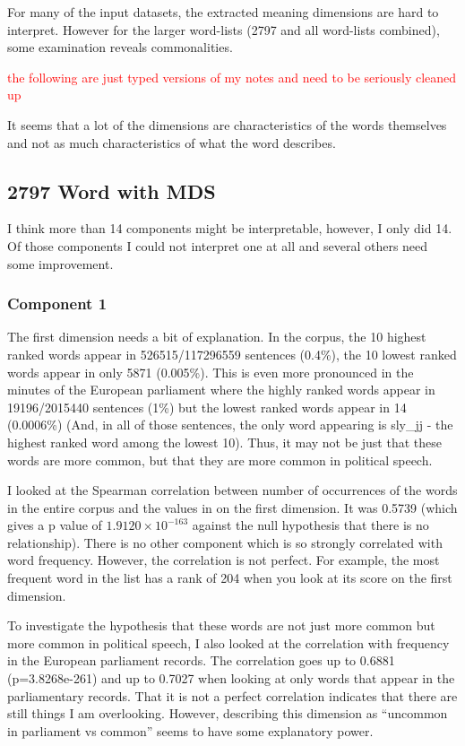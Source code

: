 \documentclass[10pt,letterpaper]{book}
\newcommand{\todo}[1]{\textcolor{red}{#1}}
\begin{document}
For many of the input datasets, the extracted meaning dimensions are hard to 
interpret. However for the larger word-lists (2797 and all word-lists 
combined), some examination reveals commonalities. 

\todo{the following are just typed versions of my notes and need to be 
seriously cleaned up}

It seems that a lot of the dimensions are characteristics of the words 
themselves and not as much characteristics of what the word describes.

\subsection{2797 Word with MDS}

I think more than 14 components might be interpretable, however, I only did 14. 
Of those components I could not interpret one at all and several others need 
some improvement. 

\subsubsection{Component 1}

The first dimension needs a bit of explanation. In the corpus, the 10 highest 
ranked words appear in 526515/117296559 sentences (0.4\%), the 10 lowest 
ranked words appear in only 5871 (0.005\%). This is even more pronounced in the 
minutes of the European parliament where the highly ranked words appear in 
19196/2015440 sentences (1\%) but the lowest ranked words appear in 14 
(0.0006\%) (And, in all of those sentences, the only word appearing is 
sly\_jj - the highest ranked word among the lowest 10). Thus, it may not be 
just that these words are more common, but that they are more common in 
political speech.

I looked at the Spearman correlation between number of occurrences of the words 
in the entire corpus and the values in on the first dimension. It was 0.5739 
(which gives a p value of $1.9120 \times 10^{-163}$ against the null hypothesis 
that there is no relationship). There is no other component which is so 
strongly correlated with word frequency. However, the correlation is not 
perfect. For example, the most frequent word in the list has a rank of 204 when 
you look at its score on the first dimension.

To investigate the hypothesis that these words are not just more common but 
more common in political speech, I also looked at the correlation with 
frequency in the European parliament records. The correlation goes up to 0.6881 
(p=3.8268e-261) and up to 0.7027 when looking at only words that appear in the 
parliamentary records. That it is not a perfect correlation indicates that 
there are still things I am overlooking. However, describing this dimension as 
``uncommon in parliament vs common'' seems to have some explanatory power.
\end{document}
